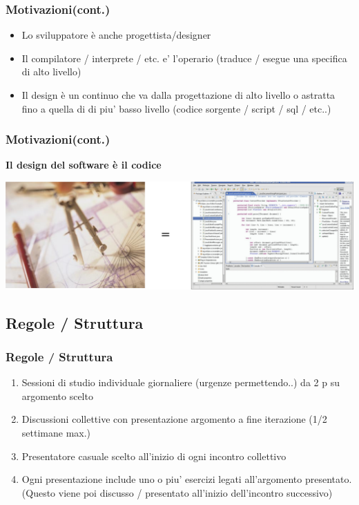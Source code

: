 \documentclass{beamer}
\begin{document}
\begin{frame}
	\frametitle{Motivazioni(cont.)}	
	\begin{itemize}
  		\item<+-> Lo sviluppatore è anche progettista/designer
  		\item<+-> Il compilatore / interprete / etc. e' l'operario (traduce / esegue una specifica di alto livello)
 		\item<+-> Il design è un continuo che va dalla progettazione di alto livello o astratta fino a quella di di piu' basso livello (codice sorgente / script / sql / etc..)
	\end{itemize}
\end{frame}

\begin{frame}
	\frametitle{Motivazioni(cont.)}	
	\begin{center}
		\textbf{Il design del software è il codice}
	\end{center}
  	\includegraphics[scale=0.25]{equals}
\end{frame}

\subsection{Regole / Struttura}
\begin{frame}
	\frametitle{Regole / Struttura}
	\begin{enumerate}
  			\item<1-> Sessioni di studio individuale giornaliere (urgenze permettendo..) da 2 p su argomento scelto
  			\item<2-> Discussioni collettive con presentazione argomento a fine iterazione (1/2 settimane max.)
  			\item<3-> Presentatore casuale scelto all'inizio di ogni incontro collettivo
  			\item<4-> Ogni presentazione include uno o piu' esercizi legati all'argomento presentato. (Questo viene poi discusso / presentato all'inizio dell'incontro successivo)
	\end{enumerate}
\end{frame}
\end{document}
